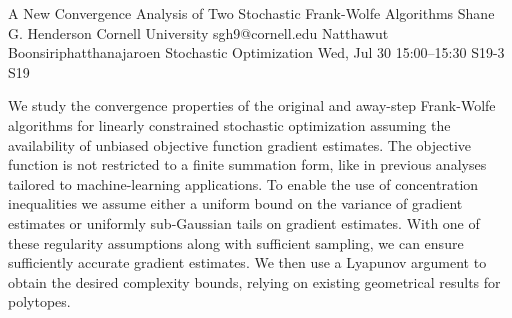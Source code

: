 \begin{talk}
  {A New Convergence Analysis of Two Stochastic Frank-Wolfe Algorithms}%
  {Shane G. Henderson}%
  {Cornell University}%
  {sgh9@cornell.edu}%
  {Natthawut Boonsiriphatthanajaroen}%
  {Stochastic Optimization}%
  {Wed, Jul 30 15:00–15:30}%
  {S19-3}%
  {S19}%
				
			
We study the convergence properties of the original and away-step
Frank-Wolfe algorithms for linearly constrained stochastic
optimization assuming the availability of unbiased objective function
gradient estimates. The objective function is not restricted to a
finite summation form, like in previous analyses tailored to
machine-learning applications. To enable the use of concentration
inequalities we assume either a uniform bound on the variance of
gradient estimates or uniformly sub-Gaussian tails on gradient
estimates. With one of these regularity assumptions along with
sufficient sampling, we can ensure sufficiently accurate gradient
estimates. We then use a Lyapunov argument to obtain the desired
complexity bounds, relying on existing geometrical results for
polytopes. 
\end{talk}


